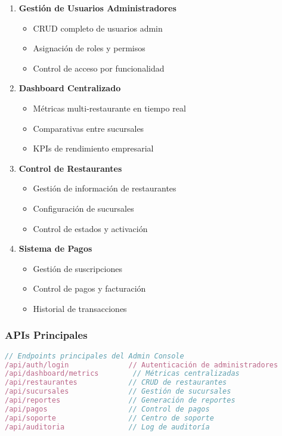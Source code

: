 \documentclass[12pt,a4paper]{article}
\begin{document}
\begin{enumerate}
    \item \textbf{Gestión de Usuarios Administradores}
    \begin{itemize}
        \item CRUD completo de usuarios admin
        \item Asignación de roles y permisos
        \item Control de acceso por funcionalidad
    \end{itemize}
    
    \item \textbf{Dashboard Centralizado}
    \begin{itemize}
        \item Métricas multi-restaurante en tiempo real
        \item Comparativas entre sucursales
        \item KPIs de rendimiento empresarial
    \end{itemize}
    
    \item \textbf{Control de Restaurantes}
    \begin{itemize}
        \item Gestión de información de restaurantes
        \item Configuración de sucursales
        \item Control de estados y activación
    \end{itemize}
    
    \item \textbf{Sistema de Pagos}
    \begin{itemize}
        \item Gestión de suscripciones
        \item Control de pagos y facturación
        \item Historial de transacciones
    \end{itemize}
\end{enumerate}

\subsubsection{APIs Principales}

\begin{lstlisting}[language=javascript]
// Endpoints principales del Admin Console
/api/auth/login              // Autenticación de administradores
/api/dashboard/metrics        // Métricas centralizadas
/api/restaurantes            // CRUD de restaurantes
/api/sucursales              // Gestión de sucursales
/api/reportes                // Generación de reportes
/api/pagos                   // Control de pagos
/api/soporte                 // Centro de soporte
/api/auditoria               // Log de auditoría
\end{lstlisting}
\end{document}
